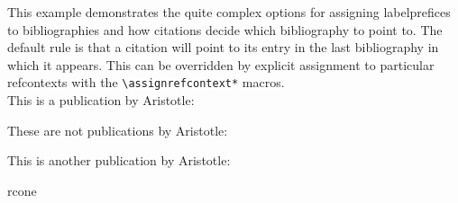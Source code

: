 \documentclass[a4paper]{article}
\newcommand{\cmd}[1]{\texttt{\textbackslash #1}}
\begin{document}
%
%
%
%
This example demonstrates the quite complex options for assigning
labelprefices to bibliographies and how citations decide which bibliography
to point to. The default rule is that a citation will point to its entry in
the last bibliography in which it appears. This can be overridden by
explicit assignment to particular refcontexts with the
\cmd{assignrefcontext*} macros.\\


This is a publication by Aristotle:
\cite{aristotle:anima} %

These are not publications by Aristotle:
\cite{yoon} %
\cite{worman} %
\cite{piccato} %
\cite{nussbaum} %

This is another publication by Aristotle:
\cite{aristotle:physics} %

\begin{refcontext}{rcone}
\printbibliography[keyword=primary, title={Aristotle Publications}]
\end{refcontext}

\printbibliography[notkeyword=primary, title={Other publications}]
\endrefcontext

\begin{refcontext}[labelprefix=Q]
\printbibliography[filter=cats, title={Other publications}]
\end{refcontext}
\end{document}
